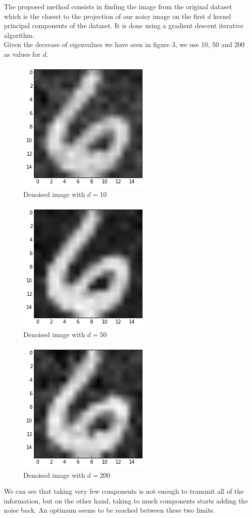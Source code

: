 \documentclass[11pt,a4paper]{article}
\begin{document}
The proposed method consists in finding the image from the original dataset which is the closest to the projection of our noisy image on the first $d$ kernel principal components of the dataset. It is done using a gradient descent iterative algorithm.
\\Given the decrease of eigenvalues we have seen in figure 3, we use 10, 50 and 200 as values for $d$.
\begin{figure}[H]
	\centering
	\noindent\includegraphics[scale=0.7]{denoised_10.png}
	\caption{Denoised image with $d=10$}
\end{figure}
\begin{figure}[H]
	\centering
	\noindent\includegraphics[scale=0.7]{denoised_100.png}
	\caption{Denoised image with $d=50$}
\end{figure}
\begin{figure}[H]
	\centering
	\noindent\includegraphics[scale=0.7]{denoised_200.png}
	\caption{Denoised image with $d=200$}
\end{figure}
We can see that taking very few components is not enough to transmit all of the information, but on the other hand, taking to much components starts adding the noise back. An optimum seems to be reached between these two limits.
\end{document}
